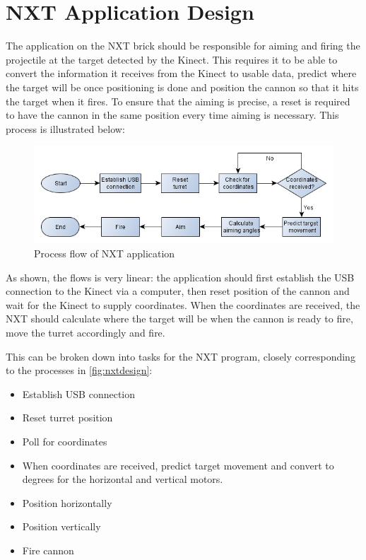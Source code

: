 \section{NXT Application Design}

\label{nxtdesign}

The application on the NXT brick should be responsible for aiming and firing the projectile at the target detected by the Kinect. This requires it to be able to convert the information it receives from the Kinect to usable data, predict where the target will be once positioning is done and position the cannon so that it hits the target when it fires. To ensure that the aiming is precise, a reset is required to have the cannon in the same position every time aiming is necessary. This process is illustrated below:

\begin{figure}[hbtp]
	\includegraphics[scale=0.5]{img/nxtdesign.png}
	\caption{Process flow of NXT application}
	\label{fig:nxtdesign}
\end{figure}

As shown, the flows is very linear: the application should first establish the USB connection to the Kinect via a computer, then reset position of the cannon and wait for the Kinect to supply coordinates. When the coordinates are received, the NXT should calculate where the target will be when the cannon is ready to fire, move the turret accordingly and fire.

This can be broken down into tasks for the NXT program, closely corresponding to the processes in \autoref{fig:nxtdesign}:
\begin{itemize}
	\item Establish USB connection
	\item Reset turret position
	\item Poll for coordinates
	\item When coordinates are received, predict target movement and convert to degrees for the horizontal and vertical motors.
	\item Position horizontally
	\item Position vertically
	\item Fire cannon
\end{itemize}

